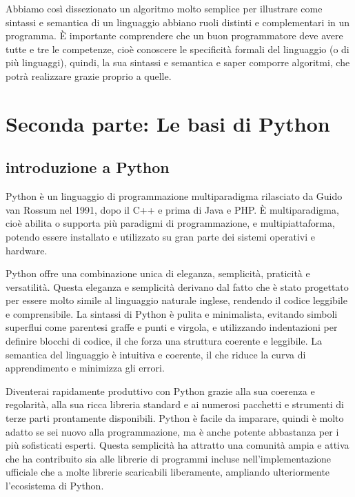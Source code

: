 \documentclass[
  letterpaper,
  DIV=11,
  numbers=noendperiod]{scrreprt}
\begin{document}
Abbiamo così dissezionato un algoritmo molto semplice per illustrare
come sintassi e semantica di un linguaggio abbiano ruoli distinti e
complementari in un programma. È importante comprendere che un buon
programmatore deve avere tutte e tre le competenze, cioè conoscere le
specificità formali del linguaggio (o di più linguaggi), quindi, la sua
sintassi e semantica e saper comporre algoritmi, che potrà realizzare
grazie proprio a quelle.

\part{Seconda parte: Le basi di Python}

\chapter{introduzione a Python}\label{introduzione-a-python}

Python è un linguaggio di programmazione multiparadigma rilasciato da
Guido van Rossum nel 1991, dopo il C++ e prima di Java e PHP. È
multiparadigma, cioè abilita o supporta più paradigmi di programmazione,
e multipiattaforma, potendo essere installato e utilizzato su gran parte
dei sistemi operativi e hardware.

Python offre una combinazione unica di eleganza, semplicità, praticità e
versatilità. Questa eleganza e semplicità derivano dal fatto che è stato
progettato per essere molto simile al linguaggio naturale inglese,
rendendo il codice leggibile e comprensibile. La sintassi di Python è
pulita e minimalista, evitando simboli superflui come parentesi graffe e
punti e virgola, e utilizzando indentazioni per definire blocchi di
codice, il che forza una struttura coerente e leggibile. La semantica
del linguaggio è intuitiva e coerente, il che riduce la curva di
apprendimento e minimizza gli errori.

Diventerai rapidamente produttivo con Python grazie alla sua coerenza e
regolarità, alla sua ricca libreria standard e ai numerosi pacchetti e
strumenti di terze parti prontamente disponibili. Python è facile da
imparare, quindi è molto adatto se sei nuovo alla programmazione, ma è
anche potente abbastanza per i più sofisticati esperti. Questa
semplicità ha attratto una comunità ampia e attiva che ha contribuito
sia alle librerie di programmi incluse nell'implementazione ufficiale
che a molte librerie scaricabili liberamente, ampliando ulteriormente
l'ecosistema di Python.
\end{document}
